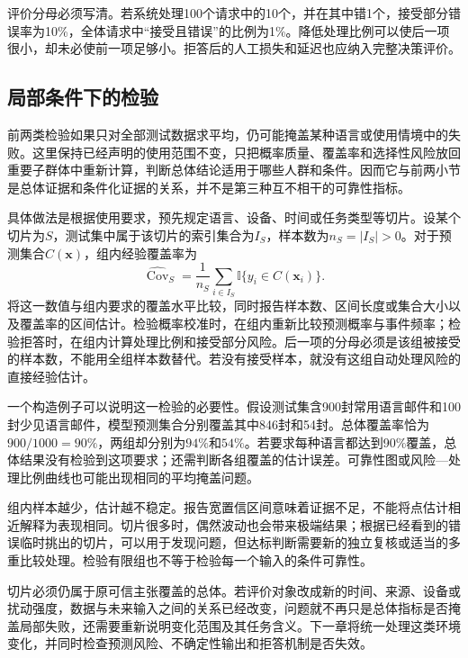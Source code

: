 评价分母必须写清。若系统处理100个请求中的10个，并在其中错1个，接受部分错误率为10\%，全体请求中“接受且错误”的比例为1\%。降低处理比例可以使后一项很小，却未必使前一项足够小。拒答后的人工损失和延迟也应纳入完整决策评价。

\subsection{局部条件下的检验}
\label{sec:reliability-conditional-evaluation}

前两类检验如果只对全部测试数据求平均，仍可能掩盖某种语言或使用情境中的失败。这里保持已经声明的使用范围不变，只把概率质量、覆盖率和选择性风险放回重要子群体中重新计算，判断总体结论适用于哪些人群和条件。因而它与前两小节是总体证据和条件化证据的关系，并不是第三种互不相干的可靠性指标。

具体做法是根据使用要求，预先规定语言、设备、时间或任务类型等切片。设某个切片为$S$，测试集中属于该切片的索引集合为$I_S$，样本数为$n_S=|I_S|>0$。对于预测集合$C(\bm{x})$，组内经验覆盖率为
\begin{equation}
 \widehat{\operatorname{Cov}}_S
 =\frac1{n_S}\sum_{i\in I_S}
   \mathbb I\{y_i\in C(\bm{x}_i)\}.
 \label{eq:reliability-group-coverage}
\end{equation}
将这一数值与组内要求的覆盖水平比较，同时报告样本数、区间长度或集合大小以及覆盖率的区间估计。检验概率校准时，在组内重新比较预测概率与事件频率；检验拒答时，在组内计算处理比例和接受部分风险。后一项的分母必须是该组被接受的样本数，不能用全组样本数替代。若没有接受样本，就没有这组自动处理风险的直接经验估计。

一个构造例子可以说明这一检验的必要性。假设测试集含900封常用语言邮件和100封少见语言邮件，模型预测集合分别覆盖其中846封和54封。总体覆盖率恰为$900/1000=90\%$，两组却分别为$94\%$和$54\%$。若要求每种语言都达到90\%覆盖，总体结果没有检验到这项要求；还需判断各组覆盖的估计误差。可靠性图或风险—处理比例曲线也可能出现相同的平均掩盖问题。

组内样本越少，估计越不稳定。报告宽置信区间意味着证据不足，不能将点估计相近解释为表现相同。切片很多时，偶然波动也会带来极端结果；根据已经看到的错误临时挑出的切片，可以用于发现问题，但达标判断需要新的独立复核或适当的多重比较处理。检验有限组也不等于检验每一个输入的条件可靠性。

切片必须仍属于原可信主张覆盖的总体。若评价对象改成新的时间、来源、设备或扰动强度，数据与未来输入之间的关系已经改变，问题就不再只是总体指标是否掩盖局部失败，还需要重新说明变化范围及其任务含义。下一章将统一处理这类环境变化，并同时检查预测风险、不确定性输出和拒答机制是否失效。

